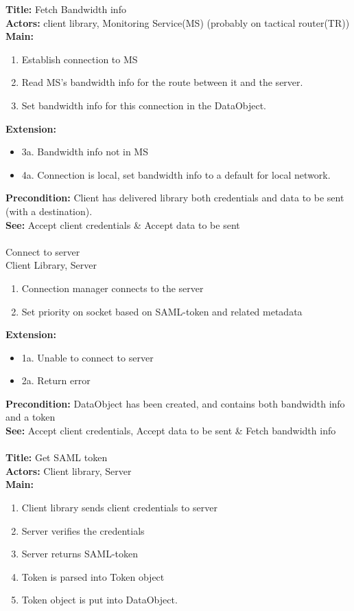 		\textbf{Title:} Fetch Bandwidth info \\
		\textbf{Actors:} client library, Monitoring Service(MS) (probably on tactical router(TR)) \\
		\textbf{Main:}
		\begin{enumerate}
			\item Establish connection to MS
			\item Read MS’s bandwidth info for the route between it and the server.
			\item Set bandwidth info for this connection in the DataObject.
		\end{enumerate}
		\textbf{Extension:}
		\begin{itemize}
			  \item[] 3a. Bandwidth info not in MS
			  \item[] 4a. Connection is local, set bandwidth info to a default for local network.
		\end{itemize}
		\textbf{Precondition:} Client has delivered library both credentials and data to be sent (with a destination). \\
		\textbf{See:} Accept client credentials & Accept data to be sent 
		\\\\
		 Connect to server \\
		 Client Library, Server \\
		\begin{enumerate}	
			\item Connection manager connects to the server
			\item Set priority on socket based on SAML-token and related metadata
		\end{enumerate}
		\textbf{Extension:}
		\begin{itemize}
			  \item[] 1a. Unable to connect to server
			  \item[] 2a. Return error
		\end{itemize}
		\textbf{Precondition:} DataObject has been created, and contains both bandwidth info and a token \\
		\textbf{See:} Accept client credentials, Accept data to be sent & Fetch bandwidth info
		\\\\
		\textbf{Title:} Get SAML token \\
		\textbf{Actors:} Client library, Server \\
		\textbf{Main:}
		\begin{enumerate}
			\item Client library sends client credentials to server
			\item Server verifies the credentials
			\item Server returns SAML-token
			\item Token is parsed into Token object
			\item Token object is put into DataObject.
		\end{enumerate}

